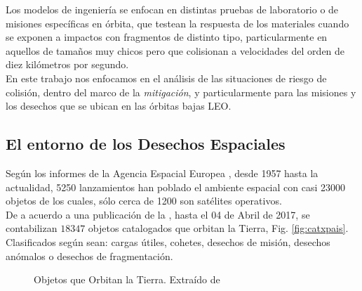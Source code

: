 Los modelos de ingenier\'ia se enfocan en distintas pruebas de laboratorio o de misiones espec\'ificas en \'orbita, que testean la respuesta de los materiales cuando se exponen a impactos con fragmentos de distinto tipo, particularmente en aquellos de tama\~nos muy chicos pero que colisionan a velocidades del orden de diez kil\'ometros por segundo.\\

En este trabajo nos enfocamos en el an\'alisis de las situaciones de riesgo de colisi\'on, dentro del marco de la {\it{mitigaci\'on}}, y particularmente para las misiones y los desechos que se ubican en las \'orbitas bajas \ac{LEO}.\\

\subsection*{El entorno de los Desechos Espaciales}
Seg\'un los informes de la Agencia Espacial Europea \citep{esaSD}, desde 1957 hasta la actualidad, 5250 lanzamientos han poblado el ambiente espacial con casi 23000 objetos de los cuales, s\'olo cerca de 1200 son sat\'elites operativos.\\

De a acuerdo a una publicaci\'on de la \cite{ODQNum}, hasta el 04 de Abril de 2017, se contabilizan $18347$ objetos catalogados que orbitan la Tierra, Fig. \ref{fig:catxpais}. Clasificados seg\'un sean: cargas \'utiles, cohetes, desechos de misi\'on, desechos an\'omalos o desechos de fragmentaci\'on.\\

\begin{figure}[!h]
\centering
  \caption[Objetos en \'Orbita]{Objetos que Orbitan la Tierra. Extra\'ido de \cite{ODQN}}
\end{figure}

